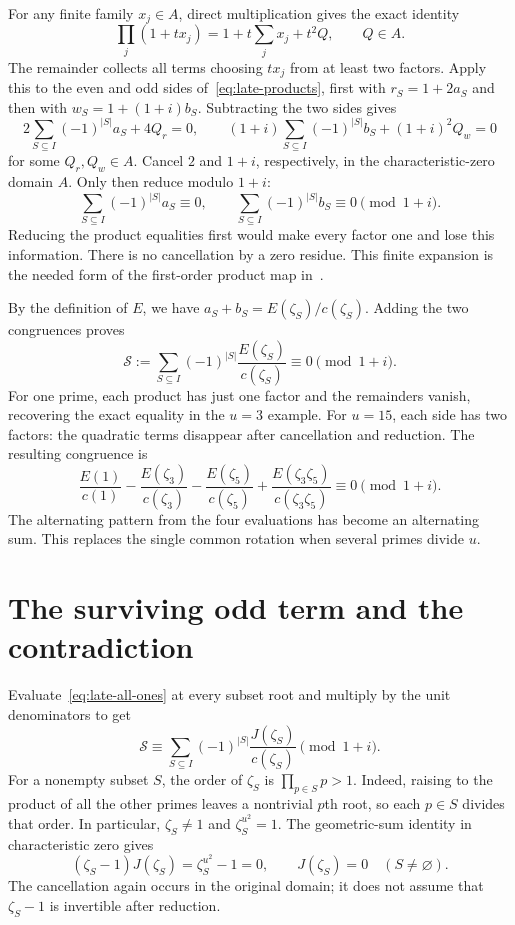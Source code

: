 \documentclass[11pt]{article}
\begin{document}
For any finite family $x_{j}\in A$, direct multiplication gives the
exact identity
\begin{equation}
 \prod_{j}(1+t x_{j})=1+t\sum_{j}x_{j}+t^{2}Q,
 \qquad Q\in A.%
 \label{eq:late-expansion}
\end{equation}
The remainder collects all terms choosing $t x_{j}$ from at least two
factors. Apply this to the even and odd sides
of~\eqref{eq:late-products}, first with $r_{S}=1+2a_{S}$ and then with
$w_{S}=1+(1+i)b_{S}$. Subtracting the two sides gives
\[
 2\sum_{S\subseteq I}{(-1)}^{|S|}a_{S}+4Q_{r}=0,
 \qquad
 (1+i)\sum_{S\subseteq I}{(-1)}^{|S|}b_{S}+{(1+i)}^{2}Q_{w}=0
\]
for some $Q_{r},Q_{w}\in A$. Cancel $2$ and $1+i$, respectively,
in the characteristic-zero domain $A$. Only then reduce modulo $1+i$:
\[
 \sum_{S\subseteq I}{(-1)}^{|S|}a_{S}\equiv0,
 \qquad
 \sum_{S\subseteq I}{(-1)}^{|S|}b_{S}\equiv0\pmod{1+i}.
\]
Reducing the product equalities first would make every factor one and
lose this information. There is no cancellation by a zero residue.
This finite expansion is the needed form of the first-order product
map in~\cite[Lemma~4.1]{circulant-source}.

By the definition of $E$, we have $a_{S}+b_{S}=E(\zeta_{S})/c(\zeta_{S})$.
Adding the two congruences proves
\begin{equation}
 \mathcal S:=\sum_{S\subseteq I}{(-1)}^{|S|}
       \frac{E(\zeta_{S})}{c(\zeta_{S})}
 \equiv0\pmod{1+i}.%
 \label{eq:late-zero-sum}
\end{equation}
For one prime, each product has just one factor and the remainders
vanish, recovering the exact equality in the $u=3$ example. For $u=15$,
each side has two factors: the quadratic terms disappear after cancellation
and reduction. The resulting congruence is
\[
 \frac{E(1)}{c(1)}
 -\frac{E(\zeta_3)}{c(\zeta_3)}
 -\frac{E(\zeta_5)}{c(\zeta_5)}
 +\frac{E(\zeta_3\zeta_5)}{c(\zeta_3\zeta_5)}
 \equiv0\pmod{1+i}.
\]
The alternating pattern from the four evaluations has become an
alternating sum. This replaces the single common rotation when several
primes divide $u$.

\section{The surviving odd term and the contradiction}%
\label{sec:late-contradiction}

Evaluate~\eqref{eq:late-all-ones} at every subset root and multiply by
the unit denominators to get
\[
 \mathcal S\equiv\sum_{S\subseteq I}{(-1)}^{|S|}
       \frac{J(\zeta_{S})}{c(\zeta_{S})}\pmod{1+i}.
\]
For a nonempty subset $S$, the order of $\zeta_{S}$ is
$\prod_{p\in S}p>1$. Indeed, raising to the product of all the other
primes leaves a nontrivial $p$th root, so each $p\in S$ divides that
order. In particular, $\zeta_{S}\ne1$ and $\zeta_{S}^{u^{2}}=1$.
The geometric-sum identity in characteristic zero gives
\[
 (\zeta_{S}-1)J(\zeta_{S})=\zeta_{S}^{u^{2}}-1=0,
 \qquad J(\zeta_{S})=0\quad(S\ne\varnothing).
\]
The cancellation again occurs in the original domain; it does not
assume that $\zeta_{S}-1$ is invertible after reduction.
\end{document}
